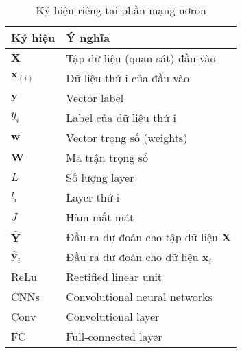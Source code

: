 \begin{table}[]

\caption{Ký hiệu riêng tại phần mạng nơron}
\label{my-label}
\renewcommand{\arraystretch}{2}
\hspace*{20mm}
\begin{tabular}{p{3cm} p{10cm} }
Ký hiệu & Ý nghĩa\\
\hline
$\textbf{X}$ 	& Tập dữ liệu (quan sát) đầu vào \\
$\textbf{x}_{(i)}$ 	& Dữ liệu thứ i của đầu vào \\
$\textbf{y}$	& Vector label\\
$y_i$ 	& Label của dữ liệu thứ i\\
$\textbf{w}$ & Vector trọng số (weights) \\
$\textbf{W}$ & Ma trận trọng số\\
$L$ 	& Số lượng layer\\
$l_i$ & Layer thứ i\\
$J$		& Hàm mất mát\\ 
$\widehat{\textbf{Y}}$ & Đầu ra dự đoán cho tập dữ liệu \textbf{X} \\
$\widehat{\textbf{y}}_i$ & Đầu ra dự đoán cho dữ liệu $\textbf{x}_{i}$ \\
ReLu	& Rectified linear unit \\
CNNs 	& Convolutional neural networks\\
Conv 	& Convolutional layer\\
FC	& Full-connected layer


\end{tabular}

\end{table}

